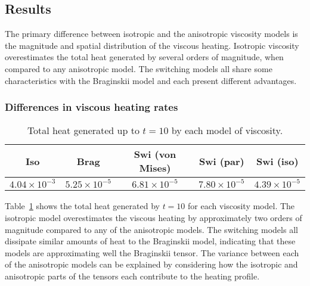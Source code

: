 \subsection{Results}

\label{sec:slow_null_results}

The primary difference between isotropic and the anisotropic viscosity models is the magnitude and spatial distribution of the viscous heating. Isotropic viscosity overestimates the total heat generated by several orders of magnitude, when compared to any anisotropic model. The switching models all share some characteristics with the Braginskii model and each present different advantages.

\subsubsection{Differences in viscous heating rates}

\begin{table}[t]
  \centering
  \caption{Total heat generated up to $t=10$ by each model of viscosity.}
  \label{tab:total_heating_slow_null}
  \begin{tabular}{ccccc}
Iso & Brag & Swi (von Mises) & Swi (par) & Swi (iso)\\
\midrule
$4.04 \times 10^{-3}$ & $5.25 \times 10^{-5}$ & $6.81 \times 10^{-5}$ & $7.80 \times 10^{-5}$ & $4.39 \times 10^{-5}$
\end{tabular}
\end{table}

Table~\ref{tab:total_heating_slow_null} shows the total heat generated by $t=10$ for each viscosity model. The isotropic model overestimates the viscous heating by approximately two orders of magnitude compared to any of the anisotropic models. The switching models all dissipate similar amounts of heat to the Braginskii model, indicating that these models are approximating well the Braginskii tensor. The variance between each of the anisotropic models can be explained by considering how the isotropic and anisotropic parts of the tensors each contribute to the heating profile.

